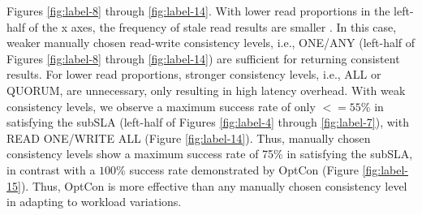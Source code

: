\documentclass[conference]{IEEEtran}
\begin{document}
  Figures \ref{fig:label-8} through \ref{fig:label-14}. With lower read proportions in the left-half of the x axes, the frequency of stale read results are smaller \cite{DBLP:conf/cloud/GolabRAKWG13}. In this case,
weaker manually chosen read-write consistency levels, i.e., ONE/ANY (left-half of Figures \ref{fig:label-8} through \ref{fig:label-14}) are sufficient for returning
consistent results. For lower read proportions, stronger consistency levels, i.e., ALL or QUORUM, are unnecessary,
only resulting in high latency overhead. With weak consistency levels, we observe a maximum success rate of only $<=55$\% in  satisfying the subSLA (left-half of Figures \ref{fig:label-4} through \ref{fig:label-7}), with READ ONE/WRITE ALL (Figure \ref{fig:label-14}). Thus, manually chosen consistency levels show a maximum success rate of 75\% in satisfying the subSLA, in contrast with a $100$\% success rate demonstrated by OptCon (Figure \ref{fig:label-15}).
Thus, OptCon is more effective than any manually chosen consistency level in adapting to workload variations.
\end{document}
